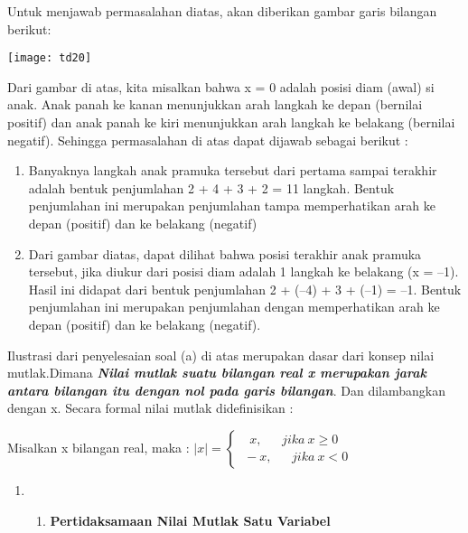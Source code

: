 \documentclass[11pt,fleqn]{book} %
\begin{document}
\noindent  

\noindent Untuk menjawab permasalahan diatas, akan diberikan gambar garis bilangan berikut:

\noindent \texttt{[image: td20]}

\noindent Dari gambar di atas, kita misalkan bahwa x = 0 adalah posisi diam (awal) si anak. Anak panah ke kanan menunjukkan arah langkah ke depan (bernilai positif) dan anak panah ke kiri menunjukkan arah langkah ke belakang (bernilai negatif). Sehingga permasalahan di atas dapat dijawab sebagai berikut : 

\begin{enumerate}
\item  Banyaknya langkah anak pramuka  tersebut dari pertama sampai terakhir  adalah bentuk penjumlahan  2 + 4 + 3 + 2 = 11 langkah. Bentuk penjumlahan ini merupakan penjumlahan tampa memperhatikan arah ke depan (positif) dan ke belakang (negatif) 

\item  Dari gambar diatas, dapat dilihat bahwa posisi terakhir anak pramuka tersebut, jika diukur dari posisi diam adalah 1 langkah ke belakang (x = --1). Hasil ini didapat dari bentuk penjumlahan  2 + (--4) + 3 + (--1)  =  --1. Bentuk penjumlahan ini merupakan penjumlahan dengan memperhatikan arah ke depan (positif) dan ke belakang (negatif).  
\end{enumerate}

\noindent 

\noindent Ilustrasi dari penyelesaian soal (a) di atas merupakan dasar dari konsep nilai mutlak.Dimana \textbf{\textit{Nilai mutlak suatu bilangan real x merupakan jarak antara bilangan itu dengan nol pada garis bilangan}}. Dan dilambangkan dengan x. Secara formal nilai mutlak didefinisikan :

\noindent Misalkan x bilangan real, maka : $\left|x\right|=\left\{ \begin{array}{c}
\ \ \ x,\ \ \ \ \ \ \ jika\ x\ge 0 \\ 
\ -x,\ \ \ \ \ \ \ jika\ x<0 \end{array}
\right.$

\noindent 

\begin{enumerate}
\item \begin{enumerate}
\item  \textbf{Pertidaksamaan Nilai Mutlak Satu Variabel}
\end{enumerate}
\end{enumerate}
\end{document}
